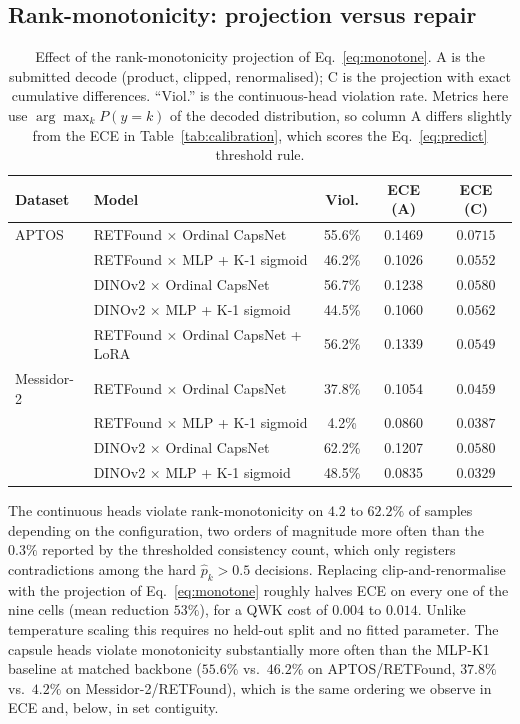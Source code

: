 \documentclass[journal]{IEEEtran}
\begin{document}
\subsection{Rank-monotonicity: projection versus repair}
\label{sec:monotone-results}
\begin{table}[!t]
\centering
\caption{Effect of the rank-monotonicity projection of Eq.~\eqref{eq:monotone}. A is the submitted decode (product, clipped, renormalised); C is the projection with exact cumulative differences. ``Viol.'' is the continuous-head violation rate. Metrics here use $\arg\max_k P(y{=}k)$ of the decoded distribution, so column A differs slightly from the ECE in Table~\ref{tab:calibration}, which scores the Eq.~\eqref{eq:predict} threshold rule.}
\label{tab:monotone}
\begin{tabular}{llccc}
\toprule
Dataset & Model & Viol. & ECE (A) & ECE (C) \\
\midrule
APTOS & RETFound $\times$ Ordinal CapsNet & 55.6\% & 0.1469 & $\mathbf{0.0715}$ \\
 & RETFound $\times$ MLP + K-1 sigmoid & 46.2\% & 0.1026 & $\mathbf{0.0552}$ \\
 & DINOv2 $\times$ Ordinal CapsNet & 56.7\% & 0.1238 & $\mathbf{0.0580}$ \\
 & DINOv2 $\times$ MLP + K-1 sigmoid & 44.5\% & 0.1060 & $\mathbf{0.0562}$ \\
 & RETFound $\times$ Ordinal CapsNet + LoRA & 56.2\% & 0.1339 & $\mathbf{0.0549}$ \\
\midrule
Messidor-2 & RETFound $\times$ Ordinal CapsNet & 37.8\% & 0.1054 & $\mathbf{0.0459}$ \\
 & RETFound $\times$ MLP + K-1 sigmoid & 4.2\% & 0.0860 & $\mathbf{0.0387}$ \\
 & DINOv2 $\times$ Ordinal CapsNet & 62.2\% & 0.1207 & $\mathbf{0.0580}$ \\
 & DINOv2 $\times$ MLP + K-1 sigmoid & 48.5\% & 0.0835 & $\mathbf{0.0329}$ \\
\bottomrule
\end{tabular}
\end{table}

The continuous heads violate rank-monotonicity on $4.2$ to $62.2\%$ of samples depending on the configuration, two orders of magnitude more often than the $0.3\%$ reported by the thresholded consistency count, which only registers contradictions among the hard $\hat{p}_k > 0.5$ decisions. Replacing clip-and-renormalise with the projection of Eq.~\eqref{eq:monotone} roughly halves ECE on every one of the nine cells (mean reduction $53\%$), for a QWK cost of $0.004$ to $0.014$. Unlike temperature scaling this requires no held-out split and no fitted parameter. The capsule heads violate monotonicity substantially more often than the MLP-K1 baseline at matched backbone ($55.6\%$ vs.\ $46.2\%$ on APTOS/RETFound, $37.8\%$ vs.\ $4.2\%$ on Messidor-2/RETFound), which is the same ordering we observe in ECE and, below, in set contiguity.
\end{document}

